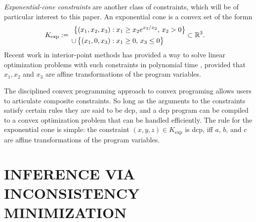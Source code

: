 \documentclass[twoside]{article}
\begin{document}
\emph{Exponential-cone constraints} are another class of constraints,
which will be of particular interest to this paper.
An exponential cone is a convex set of the formn
\begin{align*}
    K_{\mskip-1mu\exp} &:=\!\!\!\!\!\!
        \begin{aligned}
        \big\{ (x_1, x_2, x_3) &: 
                x_1 \ge x_2 e^{x_3 / x_2},\, x_2 > 0 \big\} 
        \\\quad \mathbin{\cup}\, \big\{ (x_1, 0, x_3) &: x_1 \ge 0,\, x_3 \le 0 \big\} 
    \end{aligned}
    \subset \mathbb R^3.
\end{align*}
Recent work in interior-point methods has 
provided a way to solve linear optimization problems with such constraints in polynomial time \parencite{dahl2022primal},
provided that $x_1, x_2$ and $x_3$ are affine transformations of the
program variables.  

The disciplined convex programming \parencite{dcp-thesis} approach to
convex programing allows users to articulate composite constraints.  
So long as the arguments to the constraints satisfy certain rules they are said to be dcp, and a dcp program can be compiled to a convex optimization problem that can be handled efficiently.
The rule for the exponential cone is simple: the constraint $(x,y,z) \in K_{\exp}$ is dcp, iff $a$, $b$, and $c$ are affine transformations of the program variables. 

% 



\section{INFERENCE VIA INCONSISTENCY MINIMIZATION}
    \label{sec:inf-via-inc}
\end{document}
